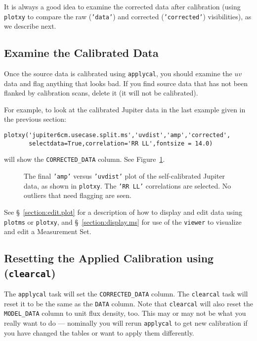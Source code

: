 It is always a good idea to examine the corrected data after calibration
(using {\tt plotxy} to compare the raw ({\tt 'data'}) and corrected 
({\tt 'corrected'}) visibilities), as we describe next.

\subsection{Examine the Calibrated Data}
\label{section:cal.correct.exam}

Once the source data is calibrated using {\tt applycal}, 
you should examine the $uv$ data and flag anything that looks bad.  If
you find source data that has not been flanked by calibration scans,
delete it (it will not be calibrated).  

For example, to look at the calibrated Jupiter data in the last
example given in the previous section:
\small
\begin{verbatim}
plotxy('jupiter6cm.usecase.split.ms','uvdist','amp','corrected',
       selectdata=True,correlation='RR LL',fontsize = 14.0)
\end{verbatim}
\normalsize
will show the {\tt CORRECTED\_DATA} column.  See 
Figure~\ref{fig:applycal_jupiter}.

\begin{figure}[h!]
\begin{center}
\caption{\label{fig:applycal_jupiter} The final {\tt 'amp'} versus
{\tt 'uvdist'} plot of the self-calibrated Jupiter data, as shown
in {\tt plotxy}.  The {\tt 'RR LL'} correlations are selected.
No outliers that need flagging are seen. }
\hrulefill
\end{center}
\end{figure}

See \S~\ref{section:edit.plot} for a description of how to display and edit 
data using {\tt plotms} or {\tt plotxy}, and \S~\ref{section:display.ms} for use of
the {\tt viewer} to visualize and edit a Measurement Set.

\subsection{Resetting the Applied Calibration using ({\tt clearcal})}
\label{section:cal.correct.clearcal}

The {\tt applycal} task will set the {\tt CORRECTED\_DATA} column.
The {\tt clearcal} task will reset it to be the same as
the {\tt DATA} column.   Note that {\tt clearcal} will also reset
the {\tt MODEL\_DATA} column to unit flux density, too.
This may or may not be what you really
want to do --- nominally you will rerun {\tt applycal} to get
new calibration if you have changed the tables or want to apply them
differently.

